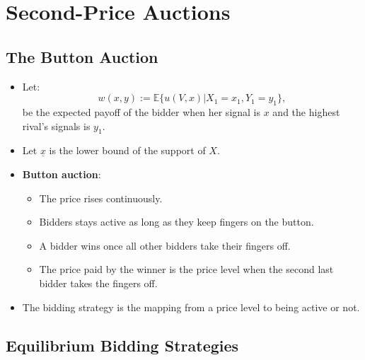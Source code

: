 \documentclass[
]{book}
\providecommand{\tightlist}{%
  \setlength{\itemsep}{0pt}\setlength{\parskip}{0pt}}
\begin{document}
\hypertarget{second-price-auctions}{%
\section{Second-Price Auctions}\label{second-price-auctions}}

\hypertarget{the-button-auction}{%
\subsection{The Button Auction}\label{the-button-auction}}

\begin{itemize}
\tightlist
\item
  Let:
  \[
  w(x, y) := \mathbb{E}\{u(V, x)|X_1 = x_1, Y_1 = y_1\},
  \]
  be the expected payoff of the bidder when her signal is \(x\) and the highest rival's signals is \(y_1\).
\item
  Let \(\underline{x}\) is the lower bound of the support of \(X\).
\item
  \textbf{Button auction}:

  \begin{itemize}
  \tightlist
  \item
    The price rises continuously.
  \item
    Bidders stays active as long as they keep fingers on the button.
  \item
    A bidder wins once all other bidders take their fingers off.
  \item
    The price paid by the winner is the price level when the second last bidder takes the fingers off.
  \end{itemize}
\item
  The bidding strategy is the mapping from a price level to being active or not.
\end{itemize}

\hypertarget{equilibrium-bidding-strategies}{%
\subsection{Equilibrium Bidding Strategies}\label{equilibrium-bidding-strategies}}
\end{document}
